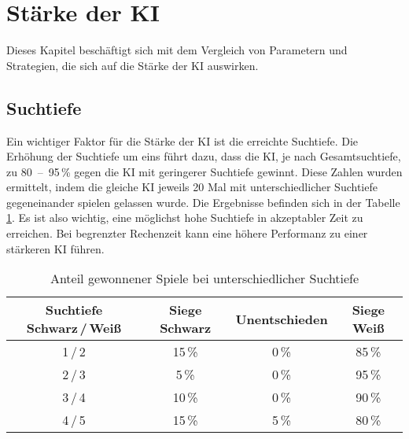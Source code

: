 \section{Stärke der KI}
Dieses Kapitel beschäftigt sich mit dem Vergleich von Parametern und Strategien, die sich auf die Stärke der KI auswirken.

\subsection{Suchtiefe}
Ein wichtiger Faktor für die Stärke der KI ist die erreichte Suchtiefe.
Die Erhöhung der Suchtiefe um eins führt dazu, dass die KI, je nach Gesamtsuchtiefe, zu 80~–~95\,\% gegen die KI mit geringerer Suchtiefe gewinnt.
Diese Zahlen wurden ermittelt, indem die gleiche KI jeweils 20 Mal mit unterschiedlicher Suchtiefe gegeneinander spielen gelassen wurde.
Die Ergebnisse befinden sich in der Tabelle \ref{table:search-depth}.
Es ist also wichtig, eine möglichst hohe Suchtiefe in akzeptabler Zeit zu erreichen.
Bei begrenzter Rechenzeit kann eine höhere Performanz zu einer stärkeren KI führen.

\begin{table}[hb]
    \centering
    \begin{tabular}{c|ccc}
    \hline
    Suchtiefe Schwarz\,/\,Weiß & Siege Schwarz & Unentschieden & Siege Weiß \\ \hline
    1\,/\,2  & 15\,\% &  0\,\% & 85\,\% \\
    2\,/\,3  &  5\,\% &  0\,\% & 95\,\% \\
    3\,/\,4  & 10\,\% &  0\,\% & 90\,\% \\
    4\,/\,5  & 15\,\% &  5\,\% & 80\,\% \\
    \hline
    \end{tabular}
    \caption{Anteil gewonnener Spiele bei unterschiedlicher Suchtiefe}
    \label{table:search-depth}
\end{table}
